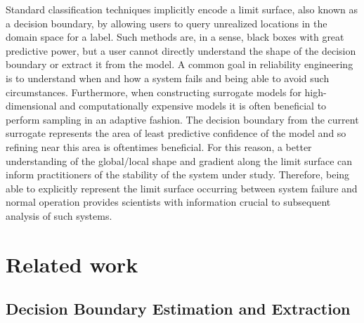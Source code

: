 \documentclass[12pt]{article}
\begin{document}
Standard classification techniques implicitly encode a limit surface, also
known as a decision boundary, by allowing users to query unrealized locations in
the domain space for a label.
%
Such methods are, in a sense, black boxes with great predictive power, but a
user cannot directly understand the shape of the decision boundary or extract
it from the model.
%
A common goal in reliability engineering is to understand when and how a system
fails and being able to avoid such circumstances.
%
Furthermore, when constructing surrogate models for high-dimensional and
computationally expensive models it is often beneficial to perform sampling in
an adaptive fashion.
%
The decision boundary from the current surrogate represents the area of least
predictive confidence of the model and so refining near this area is oftentimes
beneficial.
%
For this reason, a better understanding of the global/local shape and gradient
along the limit surface can inform practitioners of the stability of the system
under study.
%
Therefore, being able to explicitly represent the limit surface occurring
between system failure and normal operation provides scientists with information
crucial to subsequent analysis of such systems.

\section{Related work}

\subsection{Decision Boundary Estimation and Extraction}
\end{document}
